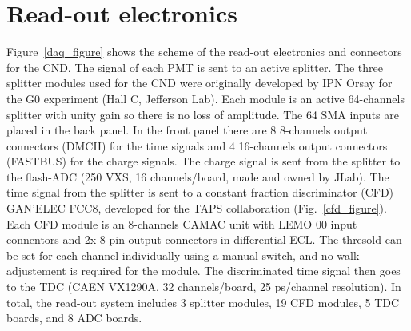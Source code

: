 \documentclass[12pt]{article}
\begin{document}
\section{Read-out electronics}
Figure~\ref{daq_figure} shows the scheme of the read-out electronics and connectors for the CND. The signal of each PMT is sent to an active splitter. The three splitter modules used for the CND were originally developed by IPN Orsay for the G0 experiment (Hall C, Jefferson Lab). Each module is an active 64-channels splitter with unity gain so there is no loss of amplitude. The 64 SMA inputs are placed in the back panel. In the front panel there are 8 8-channels output connectors (DMCH) for the time signals and 4 16-channels output connectors (FASTBUS) for the charge signals. 
The charge signal is sent from the splitter to the flash-ADC (250 VXS, 16 channels/board, made and owned by JLab). 
The time signal from the splitter is sent to a constant fraction discriminator (CFD) GAN'ELEC FCC8, developed for the TAPS collaboration (Fig.~\ref{cfd_figure}). Each CFD module is an 8-channels CAMAC unit with LEMO 00 input connentors and 2x 8-pin output connectors in differential ECL. The thresold can be set for each channel individually using a manual switch, and no walk adjustement is required for the module. 
The discriminated time signal then goes to the TDC (CAEN VX1290A, 32 channels/board, 25 ps/channel resolution). 
In total, the read-out system includes 3 splitter modules, 19 CFD modules, 5 TDC boards, and 8 ADC boards. 
\end{document}
